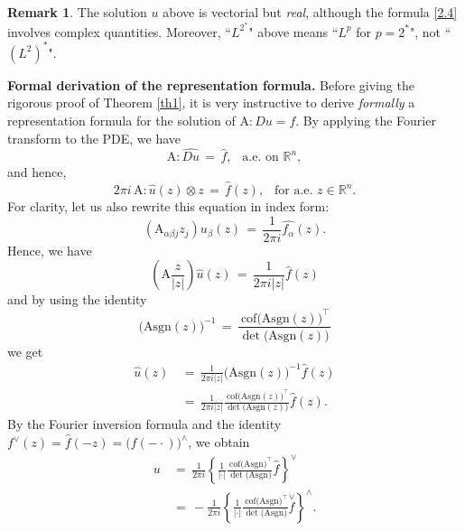 \documentclass{amsart}
\theoremstyle{definition}
\newtheorem{remark}[theorem]{Remark}
\numberwithin{equation}{section}
\begin{document}
\begin{remark} The solution $u$ above is vectorial but \emph{real}, although the formula \eqref{2.4} involves complex quantities. Moreover, ``$L^{2^*}$" above means ``$L^{p}$ for $p={2^*}$", not ``$(L^2)^*$".
\end{remark}

{\noindent} \textbf{Formal derivation of the representation formula.} Before giving the rigorous proof of Theorem \ref{th1}, it is very instructive to derive \emph{formally} a representation formula for the solution of ${\textrm{A}}  : Du =f$. By applying the Fourier transform to the PDE, we have
\[
{\textrm{A}} : \widehat{Du}\,=\, \widehat{f}, \ \ \text{ a.e.\ on }{\mathbb{R}}^n,
\]
and hence,
\[
2\pi i\, {\textrm{A}} : \widehat{u}(z) {\otimes} z \,= \, \widehat{f}(z),  \ \  \text{ for a.e. }z\in {\mathbb{R}}^n.
\]
For clarity, let us also rewrite this equation in index form:
\[
\left({\textrm{A}}_{{\alpha} {\beta} j} {z_j}\right)  \widehat{u_{\beta}}(z)\,=\, \frac{1}{2\pi i}\widehat{f_{\alpha}}(z).
\]
Hence, we have
\[
\left({\textrm{A}} \frac{z}{|z|}\right)  \widehat{u}(z) \, = \, \frac{1}{2\pi i |z|}\widehat{f}(z)
\]
and by using the identity
\begin{equation} \label{iden}
\big({\textrm{A}} {\textrm{sgn}}(z)\big)^{-1}\, =\, \frac{\ {\textrm{cof}} \big({\textrm{A}} {\textrm{sgn}}(z)\big)^\top}{ \det \big({\textrm{A}} {\textrm{sgn}}(z)\big)}
\end{equation}
we get
\begin{align}
\widehat{u}(z) \, &=\,  \frac{ 1 }{2\pi i |z|}\big({\textrm{A}} {\textrm{sgn}}(z)\big)^{-1}  \widehat{f}(z)  \nonumber\\
&=\,  \frac{1}{2\pi i |z|} \frac{\ {\textrm{cof}} \big({\textrm{A}} {\textrm{sgn}}(z)\big)^\top}{ \det \big({\textrm{A}} {\textrm{sgn}}(z)\big)}\widehat{f}(z). \nonumber
\end{align}
By the Fourier inversion formula and  the identity $f^{\vee}(z)=\widehat{f}(-z)=\big(f(-\cdot)\big)^{\wedge}$, we obtain
\begin{align}
u \,&= \, \frac{1}{2\pi i} \left\{\frac{1}{|\cdot|}\frac{\ {\textrm{cof}} \big({\textrm{A}} {\textrm{sgn}}\big)^\top}{ \det \big({\textrm{A}} {\textrm{sgn}}\big)} \widehat{f} \right\}^{\vee}    \nonumber\\
&= \, -\frac{1}{2\pi i } \left\{\frac{1}{|\cdot|}\frac{\ {\textrm{cof}} \big({\textrm{A}} {\textrm{sgn}}\big)^\top}{ \det \big({\textrm{A}} {\textrm{sgn}}\big)}\overset{\vee}{f}\right\}^{\wedge} . \nonumber
\end{align}
\end{document}
